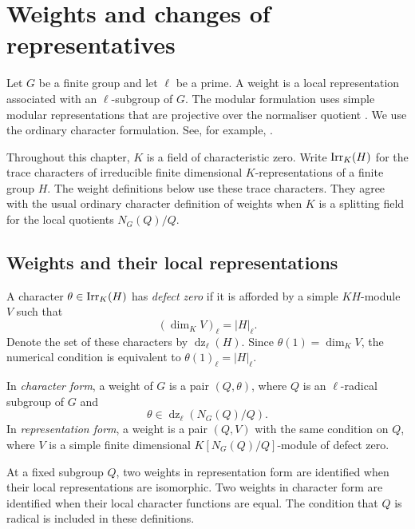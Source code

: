 \chapter{Weights and changes of representatives}
\label{chap:library:weights}

Let $G$ be a finite group and let $\ell$ be a prime. A weight is a
local representation associated with an $\ell$-subgroup of $G$.
The modular formulation uses simple modular
representations that are projective over the normaliser quotient
\cite[p.~369]{Alperin1987}. We use the ordinary character formulation.
See, for example, \cite[p.~90]{Navarro1998}.

Throughout this chapter, $K$ is a field of characteristic zero.
Write $\operatorname{Irr}_K(H)$ for the trace characters of irreducible finite
dimensional $K$-representations of a finite group $H$.
The weight definitions below use these trace characters. They agree
with the usual ordinary character definition of weights when $K$
is a splitting field for the local quotients $N_G(Q)/Q$.

\section{Weights and their local representations}

\begin{definition}
A character $\theta\in\operatorname{Irr}_K(H)$ has \emph{defect zero} if it is
afforded by a simple $K H$-module $V$ such that
\[
 (\dim_K V)_\ell=|H|_\ell.
\]
Denote the set of these characters by
$\operatorname{dz}_\ell(H)$. Since $\theta(1)=\dim_K V$, the numerical
condition is equivalent to $\theta(1)_\ell=|H|_\ell$.

In \emph{character form}, a weight of $G$ is a pair $(Q,\theta)$, where $Q$ is
an $\ell$-radical subgroup of $G$ and
\[
 \theta\in\operatorname{dz}_\ell(N_G(Q)/Q).
\]
In \emph{representation form}, a weight is a pair $(Q,V)$ with the same
condition on $Q$, where $V$ is a simple finite dimensional
$K[N_G(Q)/Q]$-module of defect zero.
\end{definition}

At a fixed subgroup $Q$, two weights in representation form are identified
when their local representations are isomorphic. Two weights in character form
are identified when their local character functions are equal.
The condition that $Q$ is radical is included in these definitions.

